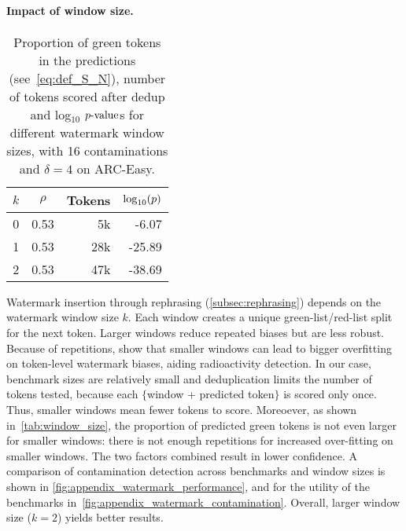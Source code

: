 \paragraph{\textbf{Impact of window size.}}
\begin{wraptable}{r}{0.4\textwidth}
    \centering
    \vspace{-0.4cm}
    \caption{\small Proportion of green tokens in the predictions (see~\autoref{eq:def_S_N}), number of tokens scored after dedup and log$_{10}$ $p\textrm{-value}$s for different watermark window sizes, with 16 contaminations and $\delta=4$ on ARC-Easy.}
    \small %
    \begin{tabular}{r r r r}
        \toprule
        $k$ & \multicolumn{1}{c}{$\rho$} & \multicolumn{1}{r}{Tokens} & \multicolumn{1}{r}{$\log_{10}(p)$} \\
        \midrule
        0 & 0.53 & 5k & -6.07 \\
        1 & 0.53 & 28k & -25.89 \\
        2 & 0.53 & 47k & -38.69 \\
        \bottomrule
    \end{tabular}
    \vspace{-0.2cm}
    \label{tab:window_size}
\end{wraptable}
Watermark insertion through rephrasing (\autoref{subsec:rephrasing}) depends on the watermark window size $k$. 
Each window creates a unique green-list/red-list split for the next token. 
Larger windows reduce repeated biases but are less robust.
Because of repetitions, \citet{sander2024watermarking} show that smaller windows can lead to bigger overfitting on token-level watermark biases, aiding radioactivity detection.
In our case, benchmark sizes are relatively small and deduplication limits the number of tokens tested, because each $\{$window + predicted token$\}$ is scored only once. 
Thus, smaller windows mean fewer tokens to score.
Moreoever, as shown in~\autoref{tab:window_size}, the proportion of predicted green tokens is not even larger for smaller windows: there is not enough repetitions for increased over-fitting on smaller windows.
The two factors combined result in lower confidence. 
A comparison of contamination detection across benchmarks and window sizes is shown in \autoref{fig:appendix_watermark_performance}, and for the utility of the benchmarks in~\autoref{fig:appendix_watermark_contamination}.
Overall, larger window size ($k=2$) yields better results.

\vspace{-0.1cm}
